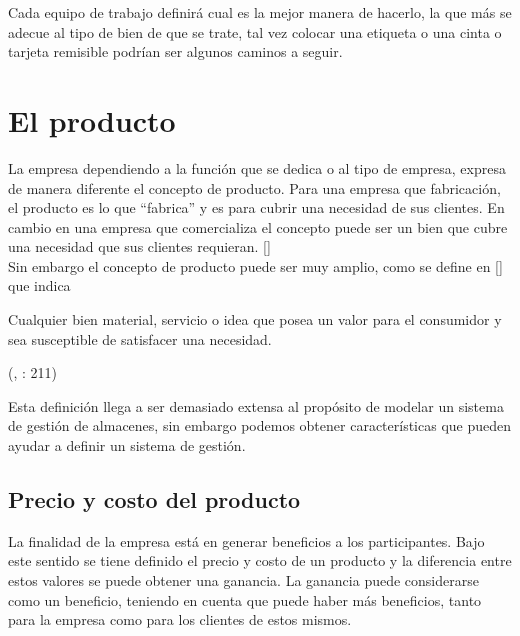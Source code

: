 Cada equipo de trabajo definirá cual es la mejor manera de hacerlo, la que más se adecue al tipo de bien de que se trate, tal vez colocar una etiqueta o una cinta o tarjeta remisible podrían ser algunos caminos a seguir.\\

\section{El producto}
La empresa dependiendo a la función que se dedica o al tipo de empresa, expresa de manera diferente el concepto de producto. Para una empresa que fabricación, el producto es lo que “fabrica” y es para cubrir una necesidad de sus clientes. En cambio en una empresa que comercializa el concepto puede ser un bien que cubre una necesidad que sus clientes requieran. [\citep{UDL:2019:Online}]\\
Sin embargo el concepto de producto puede ser muy amplio, como se define en [\citep{UDL:2019:Online}] que indica\\

\begin{center}
    \begin{minipage}{0.9\linewidth}
        \vspace{5pt}
        {\small
            Cualquier bien material, servicio o idea que posea un valor para el consumidor y sea susceptible de satisfacer una necesidad.
        }
        \begin{flushright}
            (\citeauthor{PrinStraMark}, : 211)
        \end{flushright}
        \vspace{5pt}
    \end{minipage}
\end{center}

Esta definición llega a ser demasiado extensa al propósito de modelar un sistema de gestión de almacenes, sin embargo podemos obtener características que pueden ayudar a definir un sistema de gestión.\\

\subsection{Precio y costo del producto}

La finalidad de la empresa está en generar beneficios a los participantes. Bajo este sentido se tiene definido el precio y costo de un producto y la diferencia entre estos valores se puede obtener una ganancia. La ganancia puede considerarse como un beneficio, teniendo en cuenta que puede haber más beneficios, tanto para la empresa como para los clientes de estos mismos.\\

